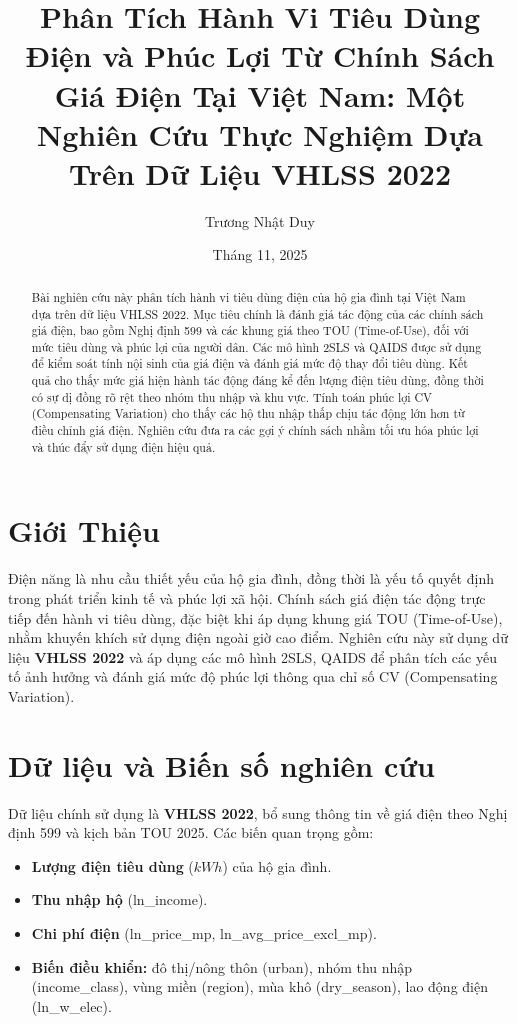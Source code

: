 \documentclass[12pt,a4paper]{article}
\title{Phân Tích Hành Vi Tiêu Dùng Điện và Phúc Lợi Từ Chính Sách Giá Điện Tại Việt Nam: Một Nghiên Cứu Thực Nghiệm Dựa Trên Dữ Liệu VHLSS 2022}
\author{Trương Nhật Duy}
\date{Tháng 11, 2025}
\begin{document}
	
	\maketitle
	
	\begin{abstract}
		Bài nghiên cứu này phân tích hành vi tiêu dùng điện của hộ gia đình tại Việt Nam dựa trên dữ liệu VHLSS 2022. Mục tiêu chính là đánh giá tác động của các chính sách giá điện, bao gồm Nghị định 599 và các khung giá theo TOU (Time-of-Use), đối với mức tiêu dùng và phúc lợi của người dân. Các mô hình 2SLS và QAIDS được sử dụng để kiểm soát tính nội sinh của giá điện và đánh giá mức độ thay đổi tiêu dùng. Kết quả cho thấy mức giá hiện hành tác động đáng kể đến lượng điện tiêu dùng, đồng thời có sự dị đồng rõ rệt theo nhóm thu nhập và khu vực. Tính toán phúc lợi CV (Compensating Variation) cho thấy các hộ thu nhập thấp chịu tác động lớn hơn từ điều chỉnh giá điện. Nghiên cứu đưa ra các gợi ý chính sách nhằm tối ưu hóa phúc lợi và thúc đẩy sử dụng điện hiệu quả.
	\end{abstract}
	
	\section{Giới Thiệu}
	Điện năng là nhu cầu thiết yếu của hộ gia đình, đồng thời là yếu tố quyết định trong phát triển kinh tế và phúc lợi xã hội. Chính sách giá điện tác động trực tiếp đến hành vi tiêu dùng, đặc biệt khi áp dụng khung giá TOU (Time-of-Use), nhằm khuyến khích sử dụng điện ngoài giờ cao điểm. Nghiên cứu này sử dụng dữ liệu \textbf{VHLSS 2022} và áp dụng các mô hình 2SLS, QAIDS để phân tích các yếu tố ảnh hưởng và đánh giá mức độ phúc lợi thông qua chỉ số CV (Compensating Variation).
	
	\section{Dữ liệu và Biến số nghiên cứu}
	Dữ liệu chính sử dụng là \textbf{VHLSS 2022}, bổ sung thông tin về giá điện theo Nghị định 599 và kịch bản TOU 2025. Các biến quan trọng gồm:
	
	\begin{itemize}
		\item \textbf{Lượng điện tiêu dùng} ($kWh$) của hộ gia đình.
		\item \textbf{Thu nhập hộ} (ln\_income).
		\item \textbf{Chi phí điện} (ln\_price\_mp, ln\_avg\_price\_excl\_mp).
		\item \textbf{Biến điều khiển:} đô thị/nông thôn (urban), nhóm thu nhập (income\_class), vùng miền (region), mùa khô (dry\_season), lao động điện (ln\_w\_elec).
	\end{itemize}
	
\end{document}
